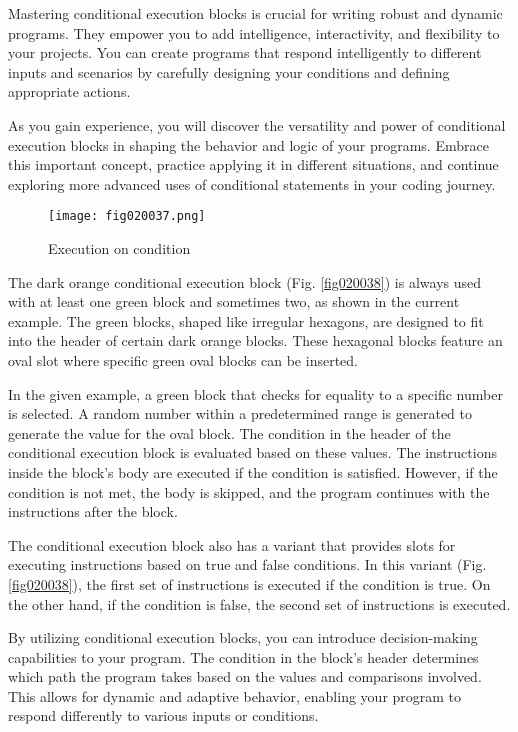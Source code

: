 Mastering conditional execution blocks is crucial for writing robust and dynamic programs. They empower you to add intelligence, interactivity, and flexibility to your projects. You can create programs that respond intelligently to different inputs and scenarios by carefully designing your conditions and defining appropriate actions.

As you gain experience, you will discover the versatility and power of conditional execution blocks in shaping the behavior and logic of your programs. Embrace this important concept, practice applying it in different situations, and continue exploring more advanced uses of conditional statements in your coding journey.

\begin{figure}[H]
   \centering
   \texttt{[image: fig020037.png]}
   \caption{Execution on condition}
\label{fig020037}
\end{figure}

The dark orange conditional execution block (Fig. \ref{fig020038}) is always used with at least one green block and sometimes two, as shown in the current example. The green blocks, shaped like irregular hexagons, are designed to fit into the header of certain dark orange blocks. These hexagonal blocks feature an oval slot where specific green oval blocks can be inserted.

In the given example, a green block that checks for equality to a specific number is selected. A random number within a predetermined range is generated to generate the value for the oval block. The condition in the header of the conditional execution block is evaluated based on these values. The instructions inside the block's body are executed if the condition is satisfied. However, if the condition is not met, the body is skipped, and the program continues with the instructions after the block.

The conditional execution block also has a variant that provides slots for executing instructions based on true and false conditions. In this variant (Fig. \ref{fig020038}), the first set of instructions is executed if the condition is true. On the other hand, if the condition is false, the second set of instructions is executed.

By utilizing conditional execution blocks, you can introduce decision-making capabilities to your program. The condition in the block's header determines which path the program takes based on the values and comparisons involved. This allows for dynamic and adaptive behavior, enabling your program to respond differently to various inputs or conditions.

